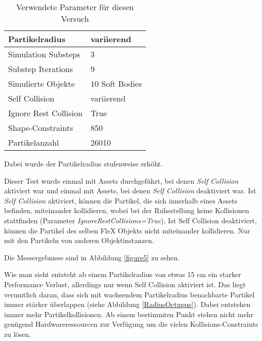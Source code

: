 \begin{table}[hbt!]
\centering
\caption{Verwendete Parameter für diesen Versuch}
\label{table_self_collision}
\begin{tabular}{l|l}
 \hline
Partikelradius & variierend  \\ \hline
Simulation Substeps & 3      \\ \hline
Substep Iterations & 9            \\ \hline
Simulierte Objekte &  10 Soft Bodies \\ \hline
Self Collision & variierend \\ \hline%
Ignore Rest Collision & True\\ \hline
Shape-Constraints & 850            \\ \hline
Partikelanzahl & 26010            \\ \hline
\end{tabular}
\end{table}

Dabei wurde der Partikelradius stufenweise erhöht. 


Dieser Test wurde einmal mit Assets durchgeführt, bei denen \textit{Self Collision} aktiviert war und einmal mit Assets, bei denen \textit{Self Collision} deaktiviert war. Ist \textit{Self Collision} aktiviert, können die Partikel, die sich innerhalb eines Assets befinden, miteinander kollidieren, wobei bei der Ruhestellung keine Kollisionen stattfinden (Parameter \textit{IgnoreRestCollisions=True}). Ist Self Collision deaktiviert, können die Partikel des selben FleX Objekts nicht miteinander kollidieren. Nur mit den Partikeln von anderen Objektinstanzen.

Die Messergebnisse sind in Abbildung \ref{figure5} zu sehen.


Wie man sieht entsteht ab einem Partikelradius von etwas 15 cm ein starker Performance Verlust, allerdings nur wenn Self Collision aktiviert ist. Das liegt vermutlich daran, dass sich mit wachsendem Partikelradius benachbarte Partikel immer stärker überlappen (siehe Abbildung \ref{RadiusOctupus}). Dabei entstehen immer mehr Partikelkollisionen. Ab einem bestimmten Punkt stehen nicht mehr genügend Hardwareressourcen zur Verfügung um die vielen Kollisions-Constraints zu lösen.

